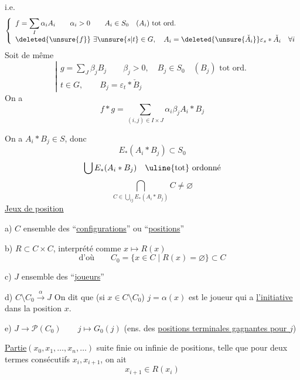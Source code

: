  i.e.
\[
\left\{\begin{array}{l}
f=\displaystyle\sum_I\alpha_i A_i\qquad\alpha_i>0\qquad A_i\in S_0\quad(A_i)\text{ tot ord.}\\
\deleted{\unsure{f}}\ \exists\unsure{s|t}\in G,\quad A_i=\deleted{\unsure{\check A_i}}\varepsilon_s\ast\check A_i\quad\forall i
\end{array}\right.
\]
Soit de même
\[
\left|\begin{array}{l}
g=\displaystyle\sum_J\beta_j B_j\qquad\beta_j>0,\quad B_j\in S_0\quad(B_j)\text{ tot ord.}\\
t\in G,\qquad B_j=\varepsilon_t\ast\check B_j
\end{array}\right.
\]
On a
\[
f\ast g=\sum_{(i,j)\in I\times J}\alpha_i\beta_j A_i\ast B_j
\]


On a $A_i\ast B_j\in S$, donc
\[
E_\ast(A_i\ast B_j)\subset S_0
\]
\[
\bigcup E_\ast(A_i\ast B_j)\quad\uline{\text{tot}}\text{ ordonné}
\]
\[
\bigcap_{C\in\bigcup_{ij}E_\ast(A_i\ast B_j)}C\ne\varnothing
\]
\uline{Jeux de position}

a) $C$ ensemble des ``\uline{configurations}'' ou ``\uline{positions}''

b) $R\subset C\times C$, interprété comme $x\longmapsto R(x)$
\[
\text{d'où}\qquad C_0=\{x\in C\mid R(x)=\varnothing\}\subset C
\]

c) $J$ ensemble des ``\uline{joueurs}''

d) $C\setminus C_0\xrightarrow{\alpha}J$ On dit que (si $x\in C\setminus C_0$) $j=\alpha(x)$ est le joueur qui a \uline{l'initiative} dans la position $x$.
\inserted{\[
C(j)=\{x\in C\setminus C_0\mid\alpha(x)=j\}\qquad
\bar C(j)=(C\setminus C_0)\setminus C(j)
\]}

e) $J\longrightarrow\mathcal P(C_0)\qquad j\longmapsto G_0(j)$ (ens. des \uline{positions terminales gagnantes pour $j$})

\uline{Partie}\quad $(x_0,x_1,\ldots,x_n,\ldots)$ suite finie ou infinie de positions, telle que pour deux termes consécutifs $x_i,x_{i+1}$, on ait
\[
x_{i+1}\in R(x_i)
\]

